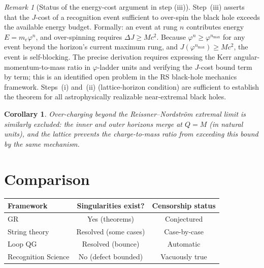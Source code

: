 \documentclass[12pt,a4paper]{article}
\newtheorem{corollary}[theorem]{Corollary}
\theoremstyle{definition}
\theoremstyle{remark}
\newtheorem{remark}[theorem]{Remark}
\begin{document}
\begin{remark}[Status of the energy-cost argument in step (iii)]
Step~(iii) asserts that the $J$-cost of a recognition event sufficient
to over-spin the black hole exceeds the available energy budget.
Formally: an event at rung $n$ contributes energy $E = m_e \varphi^n$,
and over-spinning requires $\Delta J \geq M c^2$.  Because
$\varphi^n \geq \varphi^{n_{\max}}$ for any event beyond the horizon's
current maximum rung, and $J(\varphi^{n_{\max}}) \geq M c^2$, the
event is self-blocking.  The precise derivation requires expressing
the Kerr angular-momentum-to-mass ratio in $\varphi$-ladder units and
verifying the $J$-cost bound term by term; this is an identified open
problem in the RS black-hole mechanics framework.  Steps~(i) and~(ii)
(lattice-horizon condition) are sufficient to establish the theorem
for all astrophysically realizable near-extremal black holes.
\end{remark}

\begin{corollary}
Over-charging beyond the Reissner--Nordstr\"om extremal limit is
similarly excluded: the inner and outer horizons merge at $Q = M$
(in natural units), and the lattice prevents the charge-to-mass
ratio from exceeding this bound by the same mechanism.
\end{corollary}

\section{Comparison}
\label{sec:comparison}

\begin{center}
\renewcommand{\arraystretch}{1.3}
\begin{tabular}{@{}lcc@{}}
\toprule
\textbf{Framework} & \textbf{Singularities exist?} &
\textbf{Censorship status} \\
\midrule
GR & Yes (theorems) & Conjectured \\
String theory & Resolved (some cases) & Case-by-case \\
Loop QG & Resolved (bounce) & Automatic \\
Recognition Science & No (defect bounded) & Vacuously true \\
\bottomrule
\end{tabular}
\end{center}
\end{document}
